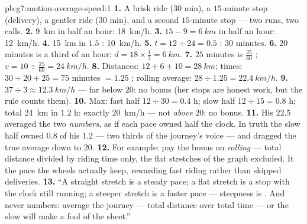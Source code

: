 \begin{solution}{pb:g7:motion-average-speed:1}
\textbf{1.} A brisk ride ($30$ min), a $15$-minute stop
(delivery), a gentler ride ($30$ min), and a second $15$-minute
stop --- two runs, two calls.
\textbf{2.} \qty{9}{km} in half an hour: \qty{18}{km/h}.
\textbf{3.} $15 - 9 = \qty{6}{km}$ in half an hour:
\qty{12}{km/h}.
\textbf{4.} \qty{15}{km} in $1.5$ : \qty{10}{km/h}.
\textbf{5.} $t = 12 \div 24 = 0.5$ : $30$ minutes.
\textbf{6.} $20$ minutes is a third of an hour: $d = 18 \times
\tfrac{1}{3} = \qty{6}{km}$.
\textbf{7.} $25$ minutes is $\tfrac{25}{60}$ ; $v = 10
\div \tfrac{25}{60} = \qty{24}{km/h}$.
\textbf{8.} Distances: $12 + 6 + 10 = \qty{28}{km}$; times:
$30 + 20 + 25 = 75$ minutes $= 1.25$ ; rolling average:
$28 \div 1.25 = \qty{22.4}{km/h}$.
\textbf{9.} $37 \div 3 \approx \qty{12.3}{km/h}$ --- far below
$20$: no bonus (her stops are honest work, but the rule counts
them).
\textbf{10.} Max: fast half $12 \div 30 = 0.4$ h; slow half
$12 \div 15 = 0.8$ h; total \qty{24}{km} in $1.2$ h: exactly
\qty{20}{km/h} --- not \emph{above} $20$: no bonus.
\textbf{11.} His $22.5$ averaged the two \emph{numbers}, as if
each pace owned half the clock. In truth the slow half owned
$0.8$ of his $1.2$  --- two thirds of the journey's voice
--- and dragged the true average down to $20$.
\textbf{12.} For example: pay the bonus on \emph{rolling}
 --- total distance divided by riding time only,
the flat stretches of the graph excluded. It  the pace
the wheels actually keep, rewarding fast riding rather than
skipped deliveries.
\textbf{13.} ``A straight stretch is a steady pace; a flat
stretch is a stop with the clock still running; a steeper
stretch is a faster pace --- steepness is . And never
 numbers: average the journey --- total distance
over total time --- or the slow  will make a fool of the
sheet.''
\end{solution}

